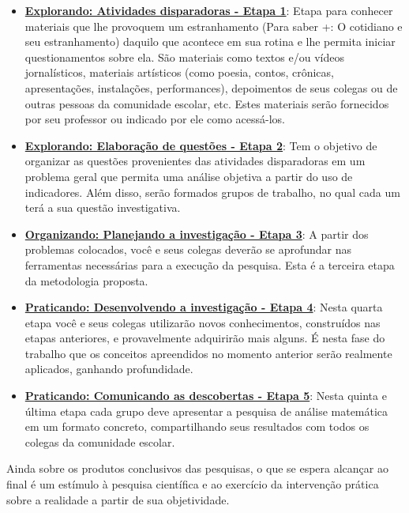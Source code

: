 \begin{itemize}
\item \hyperref[etapa1]{\textcolor{session1}{\textbf{Explorando: Atividades disparadoras - Etapa 1}}}: Etapa para conhecer materiais que lhe provoquem um estranhamento (Para saber +: O cotidiano e seu estranhamento) daquilo que acontece em sua rotina e lhe permita iniciar questionamentos sobre ela. São materiais como textos e/ou vídeos jornalísticos, materiais artísticos (como poesia, contos, crônicas, apresentações, instalações, performances), depoimentos de seus colegas ou de outras pessoas da comunidade escolar, etc. Estes materiais serão fornecidos por seu professor ou indicado por ele como acessá-los.

\item \hyperref[etapa2]{\textcolor{session1}{\textbf{Explorando: Elaboração de questões - Etapa 2}}}: Tem o objetivo de organizar as questões provenientes das atividades disparadoras em um problema geral que permita uma análise objetiva a partir do uso de indicadores. Além disso, serão formados grupos de trabalho, no qual cada um terá a sua questão investigativa.

\item \hyperref[etapa3]{\textcolor{session4}{\textbf{Organizando: Planejando a investigação - Etapa 3}}}: A partir dos problemas colocados, você e seus colegas deverão se aprofundar nas ferramentas necessárias para a execução da pesquisa. Esta é a terceira etapa da metodologia proposta.

\item \hyperref[etapa4]{\textcolor{session2}{\textbf{Praticando: Desenvolvendo a investigação - Etapa 4}}}: Nesta quarta etapa você e seus colegas utilizarão novos conhecimentos, construídos nas etapas anteriores, e provavelmente adquirirão mais alguns. É nesta fase do trabalho que os conceitos apreendidos no momento anterior serão realmente aplicados, ganhando profundidade. 

\item \hyperref[etapa5]{\textcolor{session2}{\textbf{Praticando: Comunicando as descobertas - Etapa 5}}}: Nesta quinta e última etapa cada grupo deve apresentar a pesquisa de análise matemática em um formato concreto, compartilhando seus resultados com todos os colegas da comunidade escolar.
\end{itemize}

Ainda sobre os produtos conclusivos das pesquisas, o que se espera alcançar ao final é um estímulo à pesquisa científica e ao exercício da intervenção prática sobre a realidade a partir de sua objetividade.

